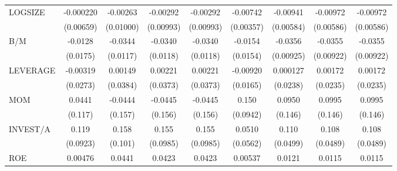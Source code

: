\begin{table}[htbp]
\begin{tabular}{l*{8}{c}}
LOGSIZE             &   -0.000220         &    -0.00263         &    -0.00292         &    -0.00292         &    -0.00742\sym{**} &    -0.00941         &    -0.00972         &    -0.00972         \\
                    &   (0.00659)         &   (0.01000)         &   (0.00993)         &   (0.00993)         &   (0.00357)         &   (0.00584)         &   (0.00586)         &   (0.00586)         \\
B/M                 &     -0.0128         &     -0.0344\sym{***}&     -0.0340\sym{***}&     -0.0340\sym{***}&     -0.0154         &     -0.0356\sym{***}&     -0.0355\sym{***}&     -0.0355\sym{***}\\
                    &    (0.0175)         &    (0.0117)         &    (0.0118)         &    (0.0118)         &    (0.0154)         &   (0.00925)         &   (0.00922)         &   (0.00922)         \\
LEVERAGE            &    -0.00319         &     0.00149         &     0.00221         &     0.00221         &    -0.00920         &    0.000127         &     0.00172         &     0.00172         \\
                    &    (0.0273)         &    (0.0384)         &    (0.0373)         &    (0.0373)         &    (0.0165)         &    (0.0238)         &    (0.0235)         &    (0.0235)         \\
MOM                 &      0.0441         &     -0.0444         &     -0.0445         &     -0.0445         &       0.150         &      0.0950         &      0.0995         &      0.0995         \\
                    &     (0.117)         &     (0.157)         &     (0.156)         &     (0.156)         &    (0.0942)         &     (0.146)         &     (0.146)         &     (0.146)         \\
INVEST/A            &       0.119         &       0.158         &       0.155         &       0.155         &      0.0510         &       0.110\sym{**} &       0.108\sym{**} &       0.108\sym{**} \\
                    &    (0.0923)         &     (0.101)         &    (0.0985)         &    (0.0985)         &    (0.0562)         &    (0.0499)         &    (0.0489)         &    (0.0489)         \\
ROE                 &     0.00476         &      0.0441         &      0.0423         &      0.0423         &     0.00537         &      0.0121         &      0.0115         &      0.0115         \\

\end{tabular}
\end{table}
